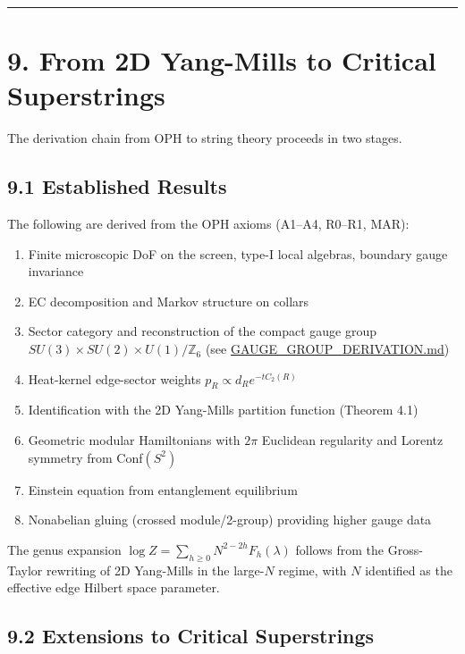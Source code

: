 \begin{center}\rule{0.5\linewidth}{0.5pt}\end{center}

\section{9. From 2D Yang-Mills to Critical Superstrings}\label{9-from-2d-yang-mills-to-critical-superstrings}

The derivation chain from OPH to string theory proceeds in two stages.

\subsection{9.1 Established Results}\label{91-established-results}

The following are derived from the OPH axioms (A1--A4, R0--R1, MAR):

\begin{enumerate}
\def\labelenumi{\arabic{enumi}.}
\tightlist
\item
  Finite microscopic DoF on the screen, type-I local algebras, boundary gauge invariance
\item
  EC decomposition and Markov structure on collars
\item
  Sector category and reconstruction of the compact gauge group \(SU(3) \times SU(2) \times U(1)/\mathbb{Z}_6\) (see \url{GAUGE_GROUP_DERIVATION.md})
\item
  Heat-kernel edge-sector weights \(p_R \propto d_R e^{-t C_2(R)}\)
\item
  Identification with the 2D Yang-Mills partition function (Theorem 4.1)
\item
  Geometric modular Hamiltonians with \(2\pi\) Euclidean regularity and Lorentz symmetry from Conf\((S^2)\)
\item
  Einstein equation from entanglement equilibrium
\item
  Nonabelian gluing (crossed module/2-group) providing higher gauge data
\end{enumerate}

The genus expansion \(\log Z = \sum_{h \geq 0} N^{2-2h} F_h(\lambda)\) follows from the Gross-Taylor rewriting of 2D Yang-Mills in the large-\(N\) regime, with \(N\) identified as the effective edge Hilbert space parameter.

\subsection{9.2 Extensions to Critical Superstrings}\label{92-extensions-to-critical-superstrings}

